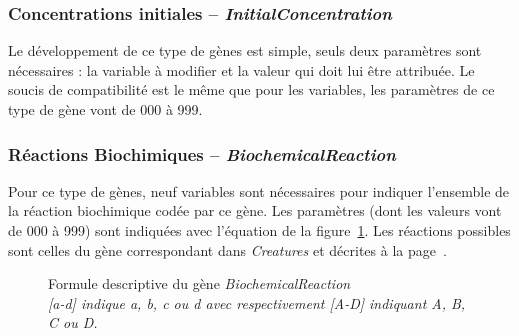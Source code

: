 \documentclass[11pt,twoside,a4paper]{article}
\begin{document}
\subsubsection{Concentrations initiales -- \emph{InitialConcentration}}

Le d{\'e}veloppement de ce type de g{\`e}nes est simple, seuls deux param{\`e}tres sont n{\'e}cessaires : la variable {\`a} modifier et la valeur qui doit lui {\^e}tre attribu{\'e}e. Le soucis de compatibilit{\'e} est le m{\^e}me que pour les variables, les param{\`e}tres de ce type de g{\`e}ne vont de 000 {\`a} 999.

\subsubsection{R{\'e}actions Biochimiques -- \emph{BiochemicalReaction}}

Pour ce type de g{\`e}nes, neuf variables sont n{\'e}cessaires pour indiquer l'ensemble de la r{\'e}action biochimique cod{\'e}e par ce g{\`e}ne. Les param{\`e}tres (dont les valeurs vont de 000 {\`a} 999) sont indiqu{\'e}es avec l'{\'e}quation de la figure~\ref{fig:BiochemicalReactionDescription}. Les r{\'e}actions possibles sont celles du g{\`e}ne correspondant dans \emph{Creatures} et  d{\'e}crites {\`a} la page~\pageref{creatures:reactions}.~\\

\begin{figure}[H]
\begin{center}
	\caption[Formule descriptive du g{\`e}ne \emph{BiochemicalReaction}]
	{Formule descriptive du g{\`e}ne \emph{BiochemicalReaction}~\\
\emph{[a-d] indique a, b, c ou d avec respectivement [A-D] indiquant A, B, C ou D. }}
	\label{fig:BiochemicalReactionDescription}
	\end{center}
\end{figure}
\end{document}
